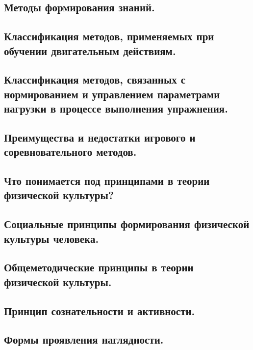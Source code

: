 \subsection{Методы формирования знаний.}



\subsection{Классификация методов, применяемых при обучении двигательным действиям.}



\subsection{Классификация методов, связанных с нормированием и управлением параметрами нагрузки в процессе выполнения упражнения.}



\subsection{Преимущества и недостатки игрового и соревновательного методов.}



\subsection{Что понимается под принципами в теории физической культуры?}



\subsection{Социальные принципы формирования физической культуры человека.}



\subsection{Общеметодические принципы в теории физической культуры.}



\subsection{Принцип сознательности и активности.}



\subsection{Формы проявления наглядности.}



